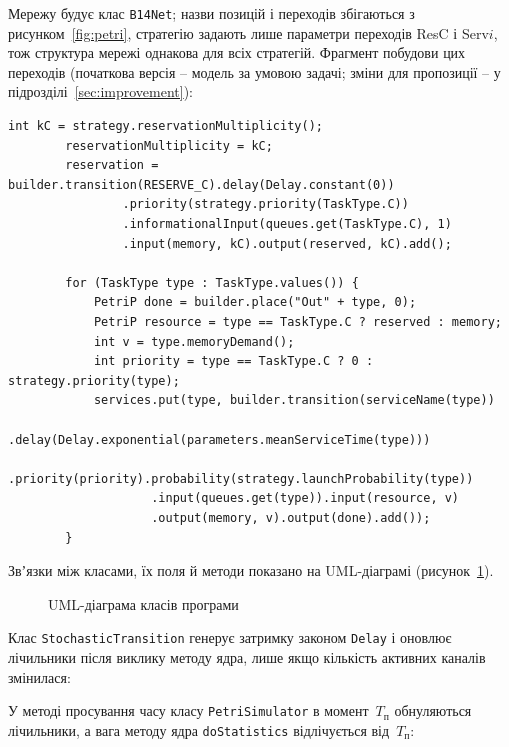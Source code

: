 Мережу будує клас \texttt{B14Net}; назви позицій і переходів збігаються з рисунком~\ref{fig:petri},
стратегію задають лише параметри переходів ResC і Serv$i$, тож структура мережі однакова для всіх
стратегій. Фрагмент побудови цих переходів
(початкова версія -- модель за умовою задачі; зміни для пропозиції -- у
підрозділі~\ref{sec:improvement}):
\begin{Verbatim}[gobble=8]
        int kC = strategy.reservationMultiplicity();
        reservationMultiplicity = kC;
        reservation = builder.transition(RESERVE_C).delay(Delay.constant(0))
                .priority(strategy.priority(TaskType.C))
                .informationalInput(queues.get(TaskType.C), 1)
                .input(memory, kC).output(reserved, kC).add();

        for (TaskType type : TaskType.values()) {
            PetriP done = builder.place("Out" + type, 0);
            PetriP resource = type == TaskType.C ? reserved : memory;
            int v = type.memoryDemand();
            int priority = type == TaskType.C ? 0 : strategy.priority(type);
            services.put(type, builder.transition(serviceName(type))
                    .delay(Delay.exponential(parameters.meanServiceTime(type)))
                    .priority(priority).probability(strategy.launchProbability(type))
                    .input(queues.get(type)).input(resource, v)
                    .output(memory, v).output(done).add());
        }
\end{Verbatim}

Звʼязки між класами, їх поля й методи показано на UML-діаграмі (рисунок~\ref{fig:uml}).

\begin{figure}
  \centering
  
  \caption{UML-діаграма класів програми}
  \label{fig:uml}
\end{figure}

Клас \texttt{StochasticTransition} генерує затримку законом \texttt{Delay} і оновлює лічильники
після виклику методу ядра, лише якщо кількість активних каналів змінилася:

У методі просування часу класу \texttt{PetriSimulator} в момент~$T_{\text{п}}$ обнуляються
лічильники, а вага методу ядра \texttt{doStatistics} відлічується від~$T_{\text{п}}$:

